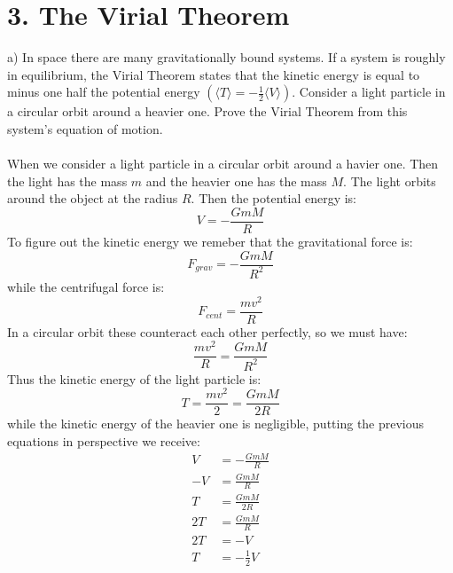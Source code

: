 \section*{3. The Virial Theorem}

a) In space there are many gravitationally bound systems. If a system is roughly in equilibrium, the 
Virial Theorem states that the kinetic energy is equal to minus one half the potential energy 
$(\langle T \rangle = -\frac{1}{2} \langle V \rangle)$. Consider a light particle in a circular orbit
around a heavier one. Prove the Virial Theorem from this system's equation of motion.\\
\\
When we consider a light particle in a circular orbit around a havier one. Then the light has the mass $m$
and the heavier one has the mass $M$. The light orbits around the object at the radius $R$. Then the 
potential energy is:
\begin{equation*}
    V = -\frac{GmM}{R}
\end{equation*}
To figure out the kinetic energy we remeber that the gravitational force is:
\begin{equation*}
    F_{grav} = -\frac{GmM}{R^2}
\end{equation*}
while the centrifugal force is:
\begin{equation*}
    F_{cent} = \frac{mv^2}{R}
\end{equation*}
In a circular orbit these counteract each other perfectly, so we must have:
\begin{equation*}
    \frac{mv^2}{R} = \frac{GmM}{R^2}
\end{equation*}
Thus the kinetic energy of the light particle is:
\begin{equation*}
    T = \frac{mv^2}{2} = \frac{GmM}{2R}
\end{equation*}
while the kinetic energy of the heavier one is negligible, putting the previous equations in perspective
we receive:
\begin{equation*}
    \begin{split}
        V &= -\frac{GmM}{R}\\
        -V &= \frac{GmM}{R}\\
        T &= \frac{GmM}{2R}\\
        2T &= \frac{GmM}{R}\\
        2T &= -V\\
        T &= -\frac{1}{2}V
    \end{split}
\end{equation*}
